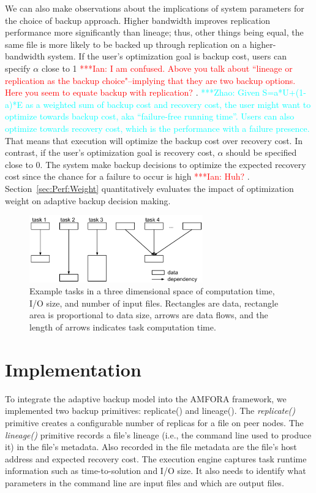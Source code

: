 \documentclass{sig-alternate}
\newcommand{\iannote}[1]{ {\textcolor{red}    { ***Ian:      #1 }}}
\newcommand{\zhaonote}[1]{{\textcolor{cyan}    { ***Zhao:      #1 }}}
\newcommand{\iannote}[1]{}
\newcommand{\zhaonote}[1]{}
\begin{document}
We can also make observations about the implications of system parameters for the choice of backup approach.
Higher bandwidth improves replication performance more significantly than lineage; thus, other things being equal, the same file is more likely to be backed up through replication on a higher-bandwidth system. If the user's optimization goal is backup cost, users can specify $\alpha$ close to 1
\iannote{I am confused. Above you talk about ``lineage or replication as the backup choice"--implying that they are two backup options. Here you seem to equate backup with replication?}. 
\zhaonote{Given S=a*U+(1-a)*E as a weighted sum of backup cost and recovery cost, the user might want to optimize towards backup cost, aka ``failure-free running time''. Users can also optimize towards recovery cost, which is the performance with a failure presence.}
That means that execution will optimize the backup cost over recovery cost. In contrast, if the user's optimization goal is recovery cost, $\alpha$ should be specified close to 0. The system make backup decisions to optimize the expected recovery cost since the chance for a failure to occur is high\iannote{Huh?}. Section~\ref{sec:Perf:Weight} quantitatively evaluates the impact of optimization weight on adaptive backup decision making. 

\begin{figure}[ht]
	\begin{center}
		\includegraphics[width=75mm]{pictures/task-taxonomy}
		\caption{Example tasks in a three dimensional space of computation time, I/O size, and number of input files. Rectangles are data, rectangle area is proportional to data size, arrows are data flows, and the length of arrows indicates task computation time.
		\label{fig:taxonomy}}
  	\end{center}
\end{figure}


\section{Implementation}
\label{sec:Impl}
To integrate the adaptive backup model into the AMFORA framework, we implemented two backup primitives: replicate() and lineage(). The {\em replicate()} primitive creates a configurable number of replicas for a file on peer nodes. The {\em lineage()} primitive records a file's lineage (i.e., the command line used to produce it) in the file's metadata. Also recorded in the file metadata are the file's host address and expected recovery cost. The execution engine captures task runtime information such as time-to-solution and I/O size. It also needs to identify what parameters in the command line are input files and which are output files.
\end{document}
